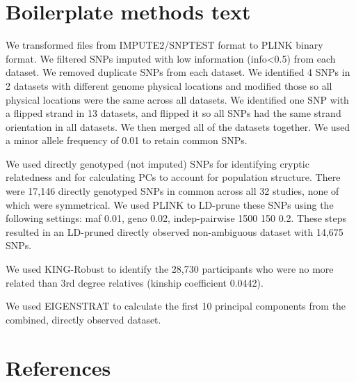 \documentclass[12pt]{article}
\begin{document}
\section{Boilerplate methods text}

We transformed files from IMPUTE2/SNPTEST format to PLINK binary format. We filtered SNPs imputed with low information (info<0.5) from each dataset. We removed duplicate SNPs from each dataset. We identified 4 SNPs in 2 datasets with different genome physical locations and modified those so all physical locations were the same across all datasets. We identified one SNP with a flipped strand in 13 datasets, and flipped it so all SNPs had the same strand orientation in all datasets. We then merged all of the datasets together. We used a minor allele frequency of 0.01 to retain common SNPs.

We used directly genotyped (not imputed) SNPs for identifying cryptic relatedness and for calculating PCs to account for population structure. There were 17,146 directly genotyped SNPs in common across all 32 studies, none of which were symmetrical. We used PLINK to LD-prune these SNPs using the following settings: maf 0.01, geno 0.02, indep-pairwise 1500 150 0.2. These steps resulted in an LD-pruned directly observed non-ambiguous dataset with 14,675 SNPs.

We used KING-Robust to identify the 28,730 participants who were no more related than 3rd degree relatives (kinship coefficient 0.0442).

We used EIGENSTRAT to calculate the first 10 principal components from the combined, directly observed dataset.

\section{References}

\end{document}
